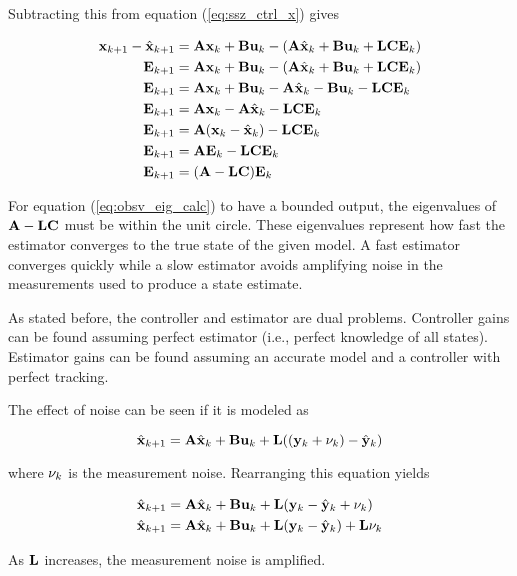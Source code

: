 Subtracting this from equation (\ref{eq:ssz_ctrl_x}) gives

\begin{align}
  \mathbf{x}_{k+1} - \hat{\mathbf{x}}_{k+1} &= \mathbf{A}\mathbf{x}_k + \mathbf{B}\mathbf{u}_k -
    (\mathbf{A}\hat{\mathbf{x}}_k + \mathbf{B}\mathbf{u}_k +
     \mathbf{L}\mathbf{C}\mathbf{E}_k) \nonumber \\
  \mathbf{E}_{k+1} &= \mathbf{A}\mathbf{x}_k + \mathbf{B}\mathbf{u}_k -
    (\mathbf{A}\hat{\mathbf{x}}_k + \mathbf{B}\mathbf{u}_k + \mathbf{L}\mathbf{C}\mathbf{E}_k)
    \nonumber \\
  \mathbf{E}_{k+1} &= \mathbf{A}\mathbf{x}_k + \mathbf{B}\mathbf{u}_k -
    \mathbf{A}\hat{\mathbf{x}}_k - \mathbf{B}\mathbf{u}_k - \mathbf{L}\mathbf{C}\mathbf{E}_k
    \nonumber \\
  \mathbf{E}_{k+1} &= \mathbf{A}\mathbf{x}_k - \mathbf{A}\hat{\mathbf{x}}_k -
    \mathbf{L}\mathbf{C}\mathbf{E}_k \nonumber \\
  \mathbf{E}_{k+1} &= \mathbf{A}(\mathbf{x}_k - \hat{\mathbf{x}}_k) -
    \mathbf{L}\mathbf{C}\mathbf{E}_k \nonumber \\
  \mathbf{E}_{k+1} &= \mathbf{A}\mathbf{E}_k - \mathbf{L}\mathbf{C}\mathbf{E}_k \nonumber \\
  \mathbf{E}_{k+1} &= (\mathbf{A} - \mathbf{L}\mathbf{C})\mathbf{E}_k \label{eq:obsv_eig_calc}
\end{align}

For equation (\ref{eq:obsv_eig_calc}) to have a bounded output, the eigenvalues
of $\mathbf{A} - \mathbf{L}\mathbf{C}$ must be within the unit circle. These eigenvalues
represent how fast the estimator converges to the true state of the given
\gls{model}. A fast estimator converges quickly while a slow estimator avoids
amplifying noise in the measurements used to produce a state estimate.

As stated before, the controller and estimator are dual problems. Controller
gains can be found assuming perfect estimator (i.e., perfect knowledge of all
\glspl{state}). Estimator gains can be found assuming an accurate \gls{model}
and a controller with perfect \gls{tracking}.

The effect of noise can be seen if it is modeled
 as

\begin{equation*}
  \hat{\mathbf{x}}_{k+1} = \mathbf{A}\hat{\mathbf{x}}_k + \mathbf{B}\mathbf{u}_k +
    \mathbf{L} ((\mathbf{y}_k + \mathbf{\nu}_k) - \hat{\mathbf{y}}_k) \\
\end{equation*}

where $\mathbf{\nu}_k$ is the measurement noise. Rearranging this equation yields

\begin{align*}
  \hat{\mathbf{x}}_{k+1} &= \mathbf{A}\hat{\mathbf{x}}_k + \mathbf{B}\mathbf{u}_k +
    \mathbf{L} (\mathbf{y}_k - \hat{\mathbf{y}}_k + \mathbf{\nu}_k) \\
  \hat{\mathbf{x}}_{k+1} &= \mathbf{A}\hat{\mathbf{x}}_k + \mathbf{B}\mathbf{u}_k +
    \mathbf{L} (\mathbf{y}_k - \hat{\mathbf{y}}_k) + \mathbf{L}\mathbf{\nu}_k
\end{align*}

As $\mathbf{L}$ increases, the measurement noise is amplified.
